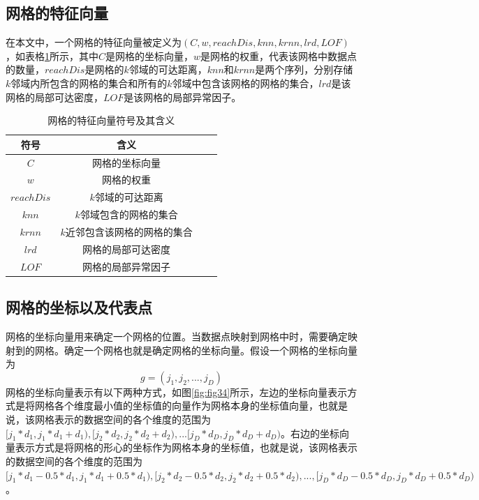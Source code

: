 \subsection{网格的特征向量}
在本文中，一个网格的特征向量被定义为$(C, w, reachDis, knn, krnn, lrd, LOF)$，如表格\ref{tab:grid}所示，其中$C$是网格的坐标向量，$w$是网格的权重，代表该网格中数据点的数量，$reachDis$是网格的$k$邻域的可达距离，$knn$和$krnn$是两个序列，分别存储$k$邻域内所包含的网格的集合和所有的$k$邻域中包含该网格的网格的集合，$lrd$是该网格的局部可达密度，$LOF$是该网格的局部异常因子。

\begin{table}
	\centering
	\caption{网格的特征向量符号及其含义} \label{tab:grid}
	\begin{tabular*}{0.9\textwidth}{@{\extracolsep{\fill}}cccc}
		\toprule
		符号			&含义 \\
		\midrule
		$C$			&网格的坐标向量 \\
		$w$			&网格的权重 \\
		$reachDis$	&$k$邻域的可达距离 \\
		$knn$	&$k$邻域包含的网格的集合 \\
		$krnn$			&$k$近邻包含该网格的网格的集合 \\
		$lrd$			&网格的局部可达密度 \\
		$LOF$	&网格的局部异常因子 \\
		\bottomrule
	\end{tabular*}
\end{table}

\subsection{网格的坐标以及代表点}
网格的坐标向量用来确定一个网格的位置。当数据点映射到网格中时，需要确定映射到的网格。确定一个网格也就是确定网格的坐标向量。假设一个网格的坐标向量为
\begin{equation}
g = \left (j_1, j_2, ..., j_D \right )
\end{equation}
网格的坐标向量表示有以下两种方式，如图\ref{fig:fig34}所示，左边的坐标向量表示方式是将网格各个维度最小值的坐标值的向量作为网格本身的坐标值向量，也就是说，该网格表示的数据空间的各个维度的范围为$[j_1 * d_1, j_1 * d_1 + d_1), [j_2 * d_2, j_2 * d_2 + d_2), ... [j_D * d_D, j_D * d_D + d_D)$。右边的坐标向量表示方式是将网格的形心的坐标作为网格本身的坐标值，也就是说，该网格表示的数据空间的各个维度的范围为$[j_1 * d_1 - 0.5 \ast d_1, j_1 * d_1 + 0.5 \ast d_1),[j_2 * d_2 - 0.5 \ast d_2, j_2 * d_2 + 0.5 \ast d_2), ..., [j_D * d_D - 0.5 \ast d_D, j_D * d_D + 0.5 \ast d_D)$。

